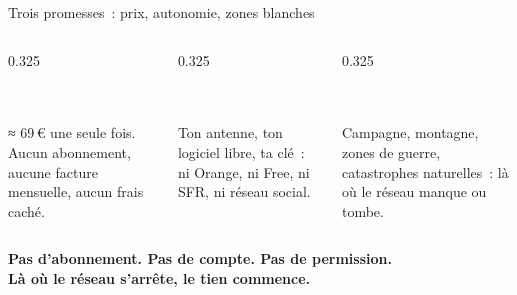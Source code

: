 \begin{frame}{Trois promesses~: prix, autonomie, zones blanches}
  \begin{columns}[T]
    \begin{column}{0.325\textwidth}
      \begin{carte}[height=4.05cm,valign=top]
        \centering
        \\[3pt]
        \\[3pt]
        {\footnotesize ≈ 69\,€ une seule fois. Aucun abonnement, aucune facture mensuelle, aucun frais caché.}
      \end{carte}
    \end{column}
    \begin{column}{0.325\textwidth}
      \begin{carte}[height=4.05cm,valign=top]
        \centering
        \\[3pt]
        \\[3pt]
        {\footnotesize Ton antenne, ton logiciel libre, ta clé~: ni Orange, ni Free, ni SFR, ni réseau social.}
      \end{carte}
    \end{column}
    \begin{column}{0.325\textwidth}
      \begin{carte}[height=4.05cm,valign=top]
        \centering
        \\[3pt]
        \\[3pt]
        {\footnotesize Campagne, montagne, zones de guerre, catastrophes naturelles~: là où le réseau manque ou tombe.}
      \end{carte}
    \end{column}
  \end{columns}
  \vspace{0.12cm}
  \begin{idee}\centering
    {\sffamily\bfseries\color{insarouge}Pas d'abonnement. Pas de compte. Pas de permission.}\\[3pt]
    {\sffamily\bfseries\color{insarouge}Là où le réseau s'arrête, le tien commence.}
  \end{idee}
\end{frame}

